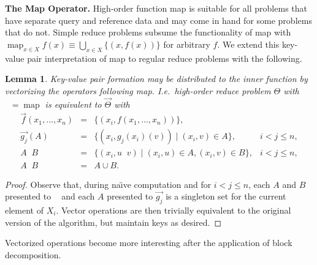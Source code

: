\documentclass{article}
\newtheorem{lemma}{Lemma}
\newcommand{\opsym}{{\scriptstyle \mathrm{o\!p}}}
\newcommand{\opcurry}[3][]{\mathop{\opsym^{#1}_{#2}{#3}}}
\newcommand{\op}[2][]{\opcurry[#1]{#2}{}}
\newcommand{\vecop}[2][]{\mathop{\overrightarrow{\opsym^{#1}_{#2}}}}
\DeclareMathOperator*{\map}{map}
\begin{document}
{\bf The Map Operator.}  High-order function map is suitable for all
problems that have separate query and reference data and may come in
hand for some problems that do not.  Simple reduce problems subsume
the functionality of map with $\map_{x \in X} f(x) \equiv \bigcup_{x
\in X} \{(x,f(x))\}$ for arbitrary $f$.  We extend this key-value pair
interpretation of map to regular reduce problems with the following.
\begin{lemma}
  Key-value pair formation may be distributed to the inner function by
  vectorizing the operators following map.  I.e.~high-order reduce
  problem $\Theta$ with $\op{i} = \map$ is equivalent to
  $\overrightarrow{\Theta}$ with
  \[ \begin{array}{rclr}
    \overrightarrow{f}(x_1,\ldots,x_n) & = & \{(x_i, f(x_1,\ldots,x_n))\}, \\
    \overrightarrow{g_j}(A) & = & \{(x_i, g_j{\scriptstyle (x_i)}(v)) \mid (x_i,v) \in A\}, & i < j \leq n, \\
    A \vecop{j} B & = & \{(x_i, u \opcurry{j}{\scriptstyle (x_i)} v) \mid (x_i,u) \in A, (x_i,v) \in B\}, & i < j \leq n, \\
    A \vecop{i} B & = & A \cup B.
  \end{array} \]
\end{lemma}
\begin{proof}
  Observe that, during na\"{\i}ve computation and for $i < j \leq n$,
  each $A$ and $B$ presented to $\vecop{j}$ and each $A$ presented to
  $\overrightarrow{g_j}$ is a singleton set for the current element of
  $X_i$.  Vector operations are then trivially equivalent to the
  original version of the algorithm, but maintain keys as desired.
\end{proof}
\noindent Vectorized operations become more interesting after the
application of block decomposition.

\end{document}
